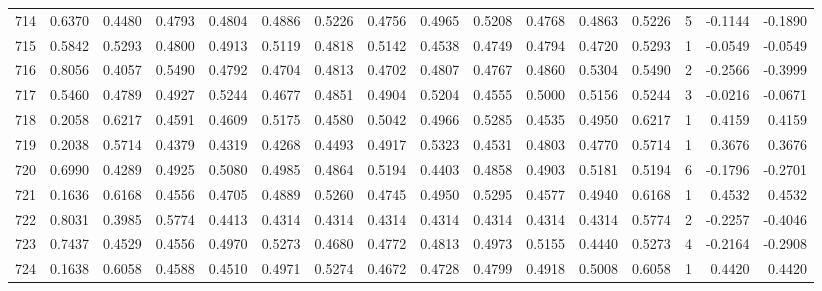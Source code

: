 \begin{tabular}{lrrrrrrrrrrrrrrr}
714 &      0.6370 &  0.4480 &  0.4793 &  0.4804 &  0.4886 &  0.5226 &  0.4756 &  0.4965 &  0.5208 &  0.4768 &   0.4863 &     0.5226 &      5 &                   -0.1144 &                    -0.1890 \\
715 &      0.5842 &  0.5293 &  0.4800 &  0.4913 &  0.5119 &  0.4818 &  0.5142 &  0.4538 &  0.4749 &  0.4794 &   0.4720 &     0.5293 &      1 &                   -0.0549 &                    -0.0549 \\
716 &      0.8056 &  0.4057 &  0.5490 &  0.4792 &  0.4704 &  0.4813 &  0.4702 &  0.4807 &  0.4767 &  0.4860 &   0.5304 &     0.5490 &      2 &                   -0.2566 &                    -0.3999 \\
717 &      0.5460 &  0.4789 &  0.4927 &  0.5244 &  0.4677 &  0.4851 &  0.4904 &  0.5204 &  0.4555 &  0.5000 &   0.5156 &     0.5244 &      3 &                   -0.0216 &                    -0.0671 \\
718 &      0.2058 &  0.6217 &  0.4591 &  0.4609 &  0.5175 &  0.4580 &  0.5042 &  0.4966 &  0.5285 &  0.4535 &   0.4950 &     0.6217 &      1 &                    0.4159 &                     0.4159 \\
719 &      0.2038 &  0.5714 &  0.4379 &  0.4319 &  0.4268 &  0.4493 &  0.4917 &  0.5323 &  0.4531 &  0.4803 &   0.4770 &     0.5714 &      1 &                    0.3676 &                     0.3676 \\
720 &      0.6990 &  0.4289 &  0.4925 &  0.5080 &  0.4985 &  0.4864 &  0.5194 &  0.4403 &  0.4858 &  0.4903 &   0.5181 &     0.5194 &      6 &                   -0.1796 &                    -0.2701 \\
721 &      0.1636 &  0.6168 &  0.4556 &  0.4705 &  0.4889 &  0.5260 &  0.4745 &  0.4950 &  0.5295 &  0.4577 &   0.4940 &     0.6168 &      1 &                    0.4532 &                     0.4532 \\
722 &      0.8031 &  0.3985 &  0.5774 &  0.4413 &  0.4314 &  0.4314 &  0.4314 &  0.4314 &  0.4314 &  0.4314 &   0.4314 &     0.5774 &      2 &                   -0.2257 &                    -0.4046 \\
723 &      0.7437 &  0.4529 &  0.4556 &  0.4970 &  0.5273 &  0.4680 &  0.4772 &  0.4813 &  0.4973 &  0.5155 &   0.4440 &     0.5273 &      4 &                   -0.2164 &                    -0.2908 \\
724 &      0.1638 &  0.6058 &  0.4588 &  0.4510 &  0.4971 &  0.5274 &  0.4672 &  0.4728 &  0.4799 &  0.4918 &   0.5008 &     0.6058 &      1 &                    0.4420 &                     0.4420 \\

\end{tabular}
